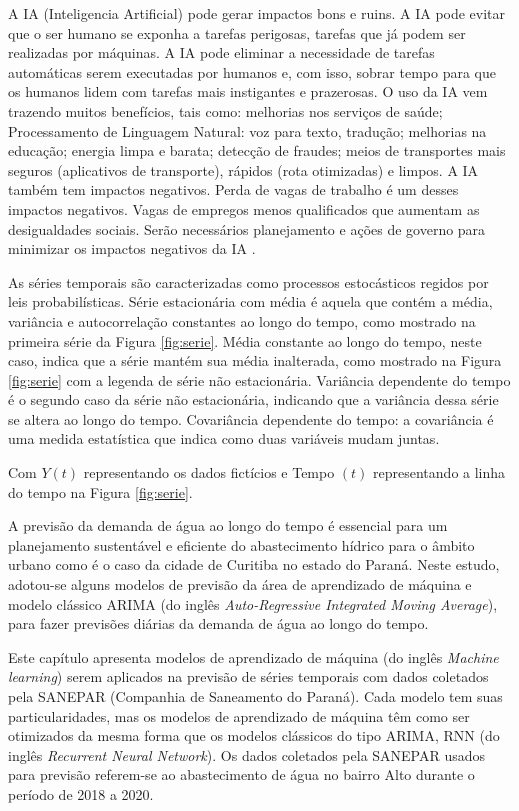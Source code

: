 A IA (Inteligencia Artificial) pode gerar impactos bons e ruins. A IA pode evitar que o ser humano se exponha a tarefas perigosas, tarefas que já podem ser realizadas por máquinas. A IA pode eliminar a necessidade de tarefas automáticas serem executadas por humanos e, com isso, sobrar tempo para que os humanos lidem com tarefas mais instigantes e prazerosas.
O uso da IA vem trazendo muitos benefícios, tais como: melhorias nos serviços de saúde; Processamento de Linguagem Natural: voz para texto, tradução; melhorias na educação; energia limpa e barata; detecção de fraudes; meios de transportes mais seguros (aplicativos de transporte), rápidos (rota otimizadas) e limpos.
A IA também tem impactos negativos. Perda de vagas de trabalho é um desses impactos negativos. Vagas de empregos menos qualificados que aumentam as desigualdades sociais. Serão necessários planejamento e ações de governo para minimizar os impactos negativos da IA \cite{Silva2021}.

As séries temporais são caracterizadas como processos estocásticos regidos por leis probabilísticas.
Série estacionária com média é aquela que contém a média, variância e autocorrelação constantes ao longo do tempo, como mostrado na primeira série da Figura \ref{fig:serie}. Média constante ao longo do tempo, neste caso, indica que a série mantém sua média inalterada, como mostrado na Figura \ref{fig:serie} com a legenda de série não estacionária. Variância dependente do tempo é o segundo caso da série não estacionária, indicando que a variância dessa série se altera ao longo do tempo. Covariância dependente do tempo: a covariância é uma medida estatística que indica como duas variáveis mudam juntas.

Com $Y(t)$ representando os dados fictícios e Tempo  $(t)$ representando a linha do tempo na Figura \ref{fig:serie}.





A previsão da demanda de água ao longo do tempo é essencial para um planejamento sustentável e eficiente do abastecimento hídrico para o âmbito urbano como é o caso da cidade de Curitiba no estado do Paraná. Neste estudo, adotou-se alguns modelos de previsão da área de aprendizado de máquina e modelo clássico ARIMA (do inglês \textit{Auto-Regressive Integrated Moving Average}), para fazer previsões diárias da demanda de água ao longo do tempo.


Este capítulo apresenta modelos de aprendizado de máquina (do inglês \textit{Machine learning}) serem aplicados na previsão de séries temporais com dados coletados pela SANEPAR (Companhia de Saneamento do Paraná). Cada modelo tem suas particularidades, mas os modelos de aprendizado de máquina têm como ser otimizados da mesma forma que os modelos clássicos do tipo ARIMA, RNN (do inglês \textit{Recurrent Neural Network}). Os dados coletados pela SANEPAR usados para previsão referem-se ao abastecimento de água no bairro Alto durante o período de 2018 a 2020.

